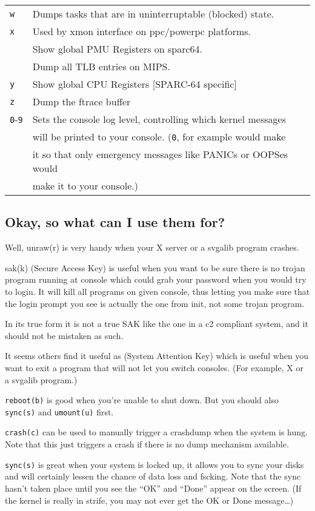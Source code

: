 \begin{longtable}[]{@{}ll@{}}
\texttt{w} & Dumps tasks that are in uninterruptable (blocked)
state.\tabularnewline
\texttt{x} & Used by xmon interface on ppc/powerpc
platforms.\tabularnewline
& Show global PMU Registers on sparc64.\tabularnewline
& Dump all TLB entries on MIPS.\tabularnewline
\texttt{y} & Show global CPU Registers {[}SPARC-64
specific{]}\tabularnewline
\texttt{z} & Dump the ftrace buffer\tabularnewline
\texttt{0}-\texttt{9} & Sets the console log level, controlling which
kernel messages\tabularnewline
& will be printed to your console. (\texttt{0}, for example would
make\tabularnewline
& it so that only emergency messages like PANICs or OOPSes
would\tabularnewline
& make it to your console.)\tabularnewline
\bottomrule
\end{longtable}

\subsection{Okay, so what can I use them
for?}\label{okay-so-what-can-i-use-them-for}

Well, unraw(r) is very handy when your X server or a svgalib program
crashes.

sak(k) (Secure Access Key) is useful when you want to be sure there is
no trojan program running at console which could grab your password when
you would try to login. It will kill all programs on given console, thus
letting you make sure that the login prompt you see is actually the one
from init, not some trojan program.

In its true form it is not a true SAK like the one in a c2 compliant
system, and it should not be mistaken as such.

It seems others find it useful as (System Attention Key) which is useful
when you want to exit a program that will not let you switch consoles.
(For example, X or a svgalib program.)

\texttt{reboot(b)} is good when you're unable to shut down. But you
should also \texttt{sync(s)} and \texttt{umount(u)} first.

\texttt{crash(c)} can be used to manually trigger a crashdump when the
system is hung. Note that this just triggers a crash if there is no dump
mechanism available.

\texttt{sync(s)} is great when your system is locked up, it allows you
to sync your disks and will certainly lessen the chance of data loss and
fscking. Note that the sync hasn't taken place until you see the ``OK''
and ``Done'' appear on the screen. (If the kernel is really in strife,
you may not ever get the OK or Done message\ldots{})

